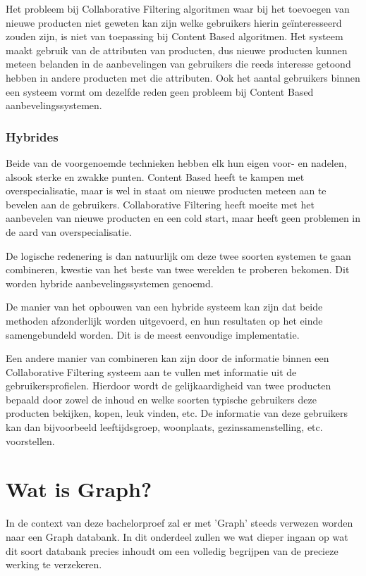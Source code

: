 Het probleem bij Collaborative Filtering algoritmen waar bij het toevoegen van nieuwe producten niet geweten kan zijn welke gebruikers hierin geïnteresseerd zouden zijn, is niet van toepassing bij Content Based algoritmen. Het systeem maakt gebruik van de attributen van producten, dus nieuwe producten kunnen meteen belanden in de aanbevelingen van gebruikers die reeds interesse getoond hebben in andere producten met die attributen. Ook het aantal gebruikers binnen een systeem vormt om dezelfde reden geen probleem bij Content Based aanbevelingssystemen. 


\subsubsection{Hybrides}
\label{sec:Hybrides}

Beide van de voorgenoemde technieken hebben elk hun eigen voor- en nadelen, alsook sterke en zwakke punten. Content Based heeft te kampen met overspecialisatie, maar is wel in staat om nieuwe producten meteen aan te bevelen aan de gebruikers. Collaborative Filtering heeft moeite met het aanbevelen van nieuwe producten en een cold start, maar heeft geen problemen in de aard van overspecialisatie.

De logische redenering is dan natuurlijk om deze twee soorten systemen te gaan combineren, kwestie van het beste van twee werelden te proberen bekomen. Dit worden hybride aanbevelingssystemen \autocite{Cano2017} genoemd.

De manier van het opbouwen van een hybride systeem kan zijn dat beide methoden afzonderlijk worden uitgevoerd, en hun resultaten op het einde samengebundeld worden. Dit is de meest eenvoudige implementatie.

Een andere manier van combineren kan zijn door de informatie binnen een Collaborative Filtering systeem aan te vullen met informatie uit de gebruikersprofielen. Hierdoor wordt de gelijkaardigheid van twee producten bepaald door zowel de inhoud en welke soorten typische gebruikers deze producten bekijken, kopen, leuk vinden, etc.
De informatie van deze gebruikers kan dan bijvoorbeeld leeftijdsgroep, woonplaats, gezinssamenstelling, etc. voorstellen.


\section{Wat is Graph?}
\label{sec:wat is Graph?}

In de context van deze bachelorproef zal er met 'Graph' steeds verwezen worden naar een Graph databank. In dit onderdeel zullen we wat dieper ingaan op wat dit soort databank precies inhoudt om een volledig begrijpen van de precieze werking te verzekeren. 

